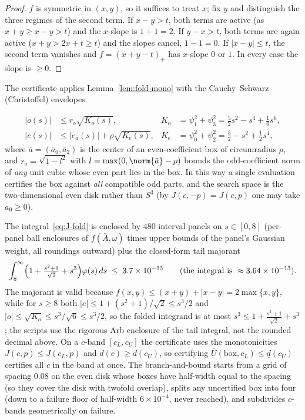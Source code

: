 \begin{proof}
$f$ is symmetric in $(x,y)$, so it suffices to treat $x$; fix $y$ and distinguish the three regimes of the second term. If $x-y>t$, both terms are active (as $x+y\ge x-y>t$) and the $x$-slope is $1+1=2$. If $y-x>t$, both terms are again active ($x+y>2x+t\ge t$) and the slopes cancel, $1-1=0$. If $|x-y|\le t$, the second term vanishes and $f=(x+y-t)_+$ has $x$-slope $0$ or $1$. In every case the slope is $\ge0$.
\end{proof}

The certificate applies Lemma~\ref{lem:fold-mono} with the Cauchy--Schwarz (Christoffel) envelopes

\begin{align*}
        |o(s)|&\le r_o\sqrt{K_o(s)},
        & K_o&=\psi_1^2+\psi_3^2=\tfrac{5}{2}s^2-s^4+\tfrac16 s^6,\\
        |e(s)|&\le|e_{\bar a}(s)|+\rho\sqrt{K_e(s)},
        & K_e&=\psi_0^2+\psi_2^2=\tfrac32-s^2+\tfrac12 s^4,
\end{align*}
where $\bar a=(\bar a_0,\bar a_2)$ is the center of an even-coefficient box of circumradius $\rho$, and $r_o=\sqrt{1-l^2}$ with $l=\max(0,\norm{\bar a}-\rho)$ bounds the odd-coefficient norm of \emph{any} unit cubic whose even part lies in the box. In this way a single evaluation certifies the box against \emph{all} compatible odd parts, and the search space is the two-dimensional even disk rather than $S^3$ (by $J(c,-p)=J(c,p)$ one may take $a_0\ge0$).

The integral~\eqref{eq:J-fold} is enclosed by $480$ interval panels on $s\in[0,8]$ (per-panel ball enclosures of $f(\bar A,\omega)$ times upper bounds of the panel's Gaussian weight, all roundings outward) plus the closed-form tail majorant
\[
        \int_8^\infty\Bigl(1+\tfrac{s^2+1}{\sqrt2}+s^3\Bigr)\varphi(s)\,ds\;\le\;3.7\times10^{-13}
        \qquad(\text{the integral is }\approx3.64\times10^{-13}).
\]
The majorant is valid because $f(x,y)\le(x+y)+|x-y|=2\max\{x,y\}$, while for $s\ge8$ both $|e|\le1+(s^2+1)/\sqrt2\le s^3/2$ and $|o|\le\sqrt{K_o}\le s^3/\sqrt6\le s^3/2$, so the folded integrand is at most $s^3\le1+\tfrac{s^2+1}{\sqrt2}+s^3$; the scripts use the rigorous Arb enclosure of the tail integral, not the rounded decimal above. On a $c$-band $[c_L,c_U]$ the certificate uses the monotonicities $J(c,p)\le J(c_L,p)$ and $d(c)\ge d(c_U)$, so certifying $\overline{U}(\text{box},c_L)\le\underline{d}(c_U)$ certifies all $c$ in the band at once. The branch-and-bound starts from a grid of spacing $0.08$ on the even disk whose boxes have half-width equal to the spacing (so they cover the disk with twofold overlap), splits any uncertified box into four (down to a failure floor of half-width $6\times10^{-4}$, never reached), and subdivides $c$-bands geometrically on failure.

